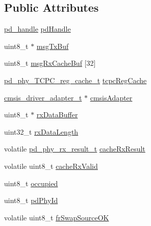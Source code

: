 \subsection*{Public Attributes}
\begin{DoxyCompactItemize}
\item 
\hyperlink{group__usb__pd__stack_ga9397835347d48ef48b6b0ecba6312213}{pd\-\_\-handle} \hyperlink{struct____pd__phy__tcpc__instance___ac32468695e40e122402f73f58e2b2883}{pd\-Handle}
\item 
uint8\-\_\-t $\ast$ \hyperlink{struct____pd__phy__tcpc__instance___a8e1d29bc419bff24ef7dce9038a0cbe6}{msg\-Tx\-Buf}
\item 
uint8\-\_\-t \hyperlink{struct____pd__phy__tcpc__instance___ab7f6700604267abb1ae7c89b848038f5}{msg\-Rx\-Cache\-Buf} \mbox{[}32\mbox{]}
\item 
\hyperlink{structpd__phy__TCPC__reg__cache__t}{pd\-\_\-phy\-\_\-\-T\-C\-P\-C\-\_\-reg\-\_\-cache\-\_\-t} \hyperlink{struct____pd__phy__tcpc__instance___aad3c9ce4cbeb9feae002869320f59c43}{tcpc\-Reg\-Cache}
\item 
\hyperlink{group__usb__pd__cmsis__wrapper_ga53daa69dcc6fde0029cec3452c8b58ff}{cmsis\-\_\-driver\-\_\-adapter\-\_\-t} $\ast$ \hyperlink{struct____pd__phy__tcpc__instance___a09664b0949afea262f2c6ca813d1dc47}{cmsis\-Adapter}
\item 
uint8\-\_\-t $\ast$ \hyperlink{struct____pd__phy__tcpc__instance___a7f28556318380a24d677a846ce484a65}{rx\-Data\-Buffer}
\item 
uint32\-\_\-t \hyperlink{struct____pd__phy__tcpc__instance___a3af6de9acc878ce8698441e39dfb52cc}{rx\-Data\-Length}
\item 
volatile \hyperlink{group__usb__pd__phy__drv_gab6924dca8731119eec80f1740a1564eb}{pd\-\_\-phy\-\_\-rx\-\_\-result\-\_\-t} \hyperlink{struct____pd__phy__tcpc__instance___aac4e841aeece50c977507048068e5b71}{cache\-Rx\-Result}
\item 
volatile uint8\-\_\-t \hyperlink{struct____pd__phy__tcpc__instance___aad459891077d4c8217e6ff3a46563a34}{cache\-Rx\-Valid}
\item 
uint8\-\_\-t \hyperlink{struct____pd__phy__tcpc__instance___a6c157191032eff69be9192ca58263192}{occupied}
\item 
uint8\-\_\-t \hyperlink{struct____pd__phy__tcpc__instance___a4dc4e216656e3e2ae311c3e5d9b30f7f}{pd\-Phy\-Id}
\item 
volatile uint8\-\_\-t \hyperlink{struct____pd__phy__tcpc__instance___a50d7547738a416ec3a69cd72896830c8}{fr\-Swap\-Source\-O\-K}
\item 

\end{DoxyCompactItemize}
